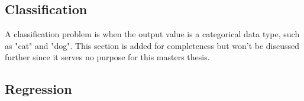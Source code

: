         \subsection{Classification}
        \label{sec:classification-supervised-learning-background}

            A classification problem is when the output value is a categorical data type, such as "cat" and "dog".
            This section is added for completeness but won't be discussed further since it serves no purpose for this masters thesis.

        \subsection{Regression}
        \label{sec:regression-supervised-learning-background}

